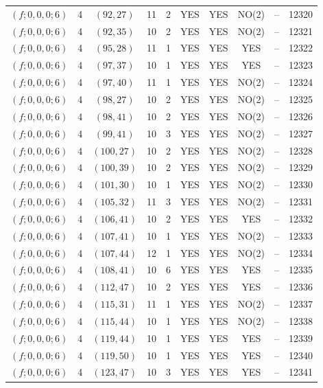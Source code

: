 \begin{longtable}{|c|c|c|c|c|c|c|c|c|c|}
$(f; 0, 0, 0; 6)$ & 4 & $(92, 27)$ & 11 & 2 & YES & YES & NO(2) & -- & 12320\\
$(f; 0, 0, 0; 6)$ & 4 & $(92, 35)$ & 10 & 2 & YES & YES & NO(2) & -- & 12321\\
$(f; 0, 0, 0; 6)$ & 4 & $(95, 28)$ & 11 & 1 & YES & YES & YES & -- & 12322\\
$(f; 0, 0, 0; 6)$ & 4 & $(97, 37)$ & 10 & 1 & YES & YES & YES & -- & 12323\\
$(f; 0, 0, 0; 6)$ & 4 & $(97, 40)$ & 11 & 1 & YES & YES & NO(2) & -- & 12324\\
$(f; 0, 0, 0; 6)$ & 4 & $(98, 27)$ & 10 & 2 & YES & YES & NO(2) & -- & 12325\\
$(f; 0, 0, 0; 6)$ & 4 & $(98, 41)$ & 10 & 2 & YES & YES & NO(2) & -- & 12326\\
$(f; 0, 0, 0; 6)$ & 4 & $(99, 41)$ & 10 & 3 & YES & YES & NO(2) & -- & 12327\\
$(f; 0, 0, 0; 6)$ & 4 & $(100, 27)$ & 10 & 2 & YES & YES & NO(2) & -- & 12328\\
$(f; 0, 0, 0; 6)$ & 4 & $(100, 39)$ & 10 & 2 & YES & YES & NO(2) & -- & 12329\\
$(f; 0, 0, 0; 6)$ & 4 & $(101, 30)$ & 10 & 1 & YES & YES & NO(2) & -- & 12330\\
$(f; 0, 0, 0; 6)$ & 4 & $(105, 32)$ & 11 & 3 & YES & YES & NO(2) & -- & 12331\\
$(f; 0, 0, 0; 6)$ & 4 & $(106, 41)$ & 10 & 2 & YES & YES & YES & -- & 12332\\
$(f; 0, 0, 0; 6)$ & 4 & $(107, 41)$ & 10 & 1 & YES & YES & NO(2) & -- & 12333\\
$(f; 0, 0, 0; 6)$ & 4 & $(107, 44)$ & 12 & 1 & YES & YES & NO(2) & -- & 12334\\
$(f; 0, 0, 0; 6)$ & 4 & $(108, 41)$ & 10 & 6 & YES & YES & YES & -- & 12335\\
$(f; 0, 0, 0; 6)$ & 4 & $(112, 47)$ & 10 & 2 & YES & YES & YES & -- & 12336\\
$(f; 0, 0, 0; 6)$ & 4 & $(115, 31)$ & 11 & 1 & YES & YES & NO(2) & -- & 12337\\
$(f; 0, 0, 0; 6)$ & 4 & $(115, 44)$ & 10 & 1 & YES & YES & NO(2) & -- & 12338\\
$(f; 0, 0, 0; 6)$ & 4 & $(119, 44)$ & 10 & 1 & YES & YES & YES & -- & 12339\\
$(f; 0, 0, 0; 6)$ & 4 & $(119, 50)$ & 10 & 1 & YES & YES & YES & -- & 12340\\
$(f; 0, 0, 0; 6)$ & 4 & $(123, 47)$ & 10 & 3 & YES & YES & YES & -- & 12341\\

\end{longtable}
